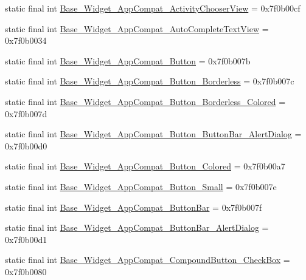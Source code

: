 \begin{CompactItemize}
static final int \hyperlink{classandroid_1_1support_1_1graphics_1_1drawable_1_1_r_1_1style_636a294631767497996d0ae72d1cac2c}{Base\_\-Widget\_\-AppCompat\_\-ActivityChooserView} = 0x7f0b00cf
\item 
static final int \hyperlink{classandroid_1_1support_1_1graphics_1_1drawable_1_1_r_1_1style_672c0920ad7549bb04c5123763c556a9}{Base\_\-Widget\_\-AppCompat\_\-AutoCompleteTextView} = 0x7f0b0034
\item 
static final int \hyperlink{classandroid_1_1support_1_1graphics_1_1drawable_1_1_r_1_1style_0555c544342cbb24755cb72f272c31d0}{Base\_\-Widget\_\-AppCompat\_\-Button} = 0x7f0b007b
\item 
static final int \hyperlink{classandroid_1_1support_1_1graphics_1_1drawable_1_1_r_1_1style_d5f339f101971f5c3d014d381d4c4fa8}{Base\_\-Widget\_\-AppCompat\_\-Button\_\-Borderless} = 0x7f0b007c
\item 
static final int \hyperlink{classandroid_1_1support_1_1graphics_1_1drawable_1_1_r_1_1style_ebc2bc45e99158902c9003c40ff0d87c}{Base\_\-Widget\_\-AppCompat\_\-Button\_\-Borderless\_\-Colored} = 0x7f0b007d
\item 
static final int \hyperlink{classandroid_1_1support_1_1graphics_1_1drawable_1_1_r_1_1style_b598b55fdda8c43983429b569bcbcd5d}{Base\_\-Widget\_\-AppCompat\_\-Button\_\-ButtonBar\_\-AlertDialog} = 0x7f0b00d0
\item 
static final int \hyperlink{classandroid_1_1support_1_1graphics_1_1drawable_1_1_r_1_1style_9929fac2aa5409bc621a6952f75fd13d}{Base\_\-Widget\_\-AppCompat\_\-Button\_\-Colored} = 0x7f0b00a7
\item 
static final int \hyperlink{classandroid_1_1support_1_1graphics_1_1drawable_1_1_r_1_1style_510646bc3720dfb3f00407c13abcec12}{Base\_\-Widget\_\-AppCompat\_\-Button\_\-Small} = 0x7f0b007e
\item 
static final int \hyperlink{classandroid_1_1support_1_1graphics_1_1drawable_1_1_r_1_1style_6efd39691139a6605543c663aa334c6c}{Base\_\-Widget\_\-AppCompat\_\-ButtonBar} = 0x7f0b007f
\item 
static final int \hyperlink{classandroid_1_1support_1_1graphics_1_1drawable_1_1_r_1_1style_4b50fe2e3a0e5eca4e9ad01279a297eb}{Base\_\-Widget\_\-AppCompat\_\-ButtonBar\_\-AlertDialog} = 0x7f0b00d1
\item 
static final int \hyperlink{classandroid_1_1support_1_1graphics_1_1drawable_1_1_r_1_1style_0aea0e48f31ec084102cf3a6a7bd2bfc}{Base\_\-Widget\_\-AppCompat\_\-CompoundButton\_\-CheckBox} = 0x7f0b0080
\item 

\end{CompactItemize}
